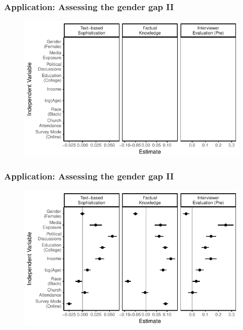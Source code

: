 \documentclass{beamer}
\begin{document}
\begin{frame} %
\frametitle{Application: Assessing the gender gap II}
  \begin{figure}
  \includegraphics{../fig/determinants_empty.pdf}
  \end{figure}
\end{frame}
\begin{frame} %
\frametitle{Application: Assessing the gender gap II}
  \begin{figure}
  \includegraphics{../fig/determinants_pres.pdf}
  \end{figure}
\end{frame}

\end{document}
